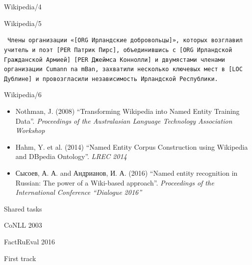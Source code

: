 \documentclass[10pt, compress]{beamer}
\begin{document}
\begin{frame}{Wikipedia/4}


\end{frame}

\begin{frame}{Wikipedia/5}

{\tt
Члены организации «[{\sc ORG} Ирландские добровольцы]», которых возглавил 
учитель и поэт [{\sc PER} Патрик Пирс], объединившись с [{\sc ORG} Ирландской 
Гражданской Армией] [{\sc PER} Джеймса Коннолли] и двумястами членами 
организации \alert<2>{Cumann na mBan}, захватили несколько ключевых мест 
в [{\sc LOC} Дублине] и провозгласили независимость \alert<2>{Ирландской Республики}.
}

\end{frame}

\begin{frame}{Wikipedia/6}

\begin{itemize}
  \item Nothman, J. (2008) ``Transforming Wikipedia into Named Entity Training Data''. \emph{Proceedings of the Australasian Language Technology Association Workshop}
  \item Hahm, Y. et al. (2014) ``Named Entity Corpus Construction using Wikipedia and DBpedia Ontology''. \emph{LREC 2014}
  \item Сысоев, А. А. and Андрианов, И. А. (2016) ``Named entity recognition in Russian: The power of a Wiki-based approach''. \emph{Proceedings of the International Conference “Dialogue 2016”}
\end{itemize}

\end{frame}



\begin{frame}[standout]
Shared tasks
\end{frame}

\begin{frame}{CoNLL 2003}


\end{frame}

\begin{frame}{FactRuEval 2016}


\end{frame}

\begin{frame}{First track}

\end{frame}
\end{document}
